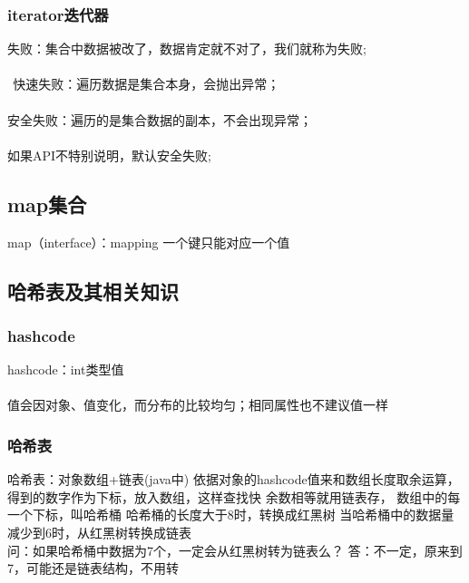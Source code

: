 \documentclass[12pt]{ctexart}
\begin{document}
\subsubsection{iterator迭代器}
失败：集合中数据被改了，数据肯定就不对了，我们就称为失败;\paragraph{}
$\ \ $快速失败：遍历数据是集合本身，会抛出异常；\paragraph{}
\quad 安全失败：遍历的是集合数据的副本，不会出现异常；\paragraph{}
\quad 如果API不特别说明，默认安全失败;\paragraph{}
\subsection{map集合}
map（interface）：mapping
一个键只能对应一个值
\subsection{哈希表及其相关知识}
\subsubsection{hashcode}
hashcode：int类型值\paragraph{}
值会因对象、值变化，而分布的比较均匀；相同属性也不建议值一样
\subsubsection{哈希表}
哈希表：对象数组+链表(java中)
依据对象的hashcode值来和数组长度取余运算，得到的数字作为下标，放入数组，这样查找快
余数相等就用链表存，
数组中的每一个下标，叫哈希桶
哈希桶的长度大于8时，转换成红黑树
当哈希桶中的数据量减少到6时，从红黑树转换成链表
\\
问：如果哈希桶中数据为7个，一定会从红黑树转为链表么？
答：不一定，原来到7，可能还是链表结构，不用转
\end{document}
